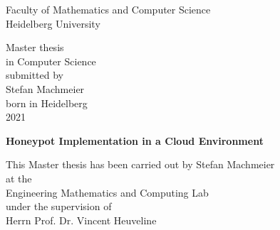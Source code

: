 \thispagestyle{empty}
\begin{center}
  \renewcommand{\baselinestretch}{2.00}
  \Large%
  Faculty of Mathematics and Computer Science\\
  \large Heidelberg University
  \par\vfill\normalfont
  Master thesis\\
  in Computer Science\\
  submitted by\\
  Stefan Machmeier\\
  born in Heidelberg\\
  2021
\end{center}
\newpage

\thispagestyle{empty}
\begin{center}
  \renewcommand{\baselinestretch}{2.00}
  \Large\bfseries%
    Honeypot Implementation in a Cloud Environment
  \par
  \vfill
  \large\normalfont
  This Master thesis has been carried out by Stefan Machmeier\\
  at the\\
  Engineering Mathematics and Computing Lab\\
  under the supervision of\\
  Herrn Prof. Dr. Vincent Heuveline
\end{center}\par
\vspace{5\baselineskip}

\renewcommand{\baselinestretch}{1.00}\normalsize
